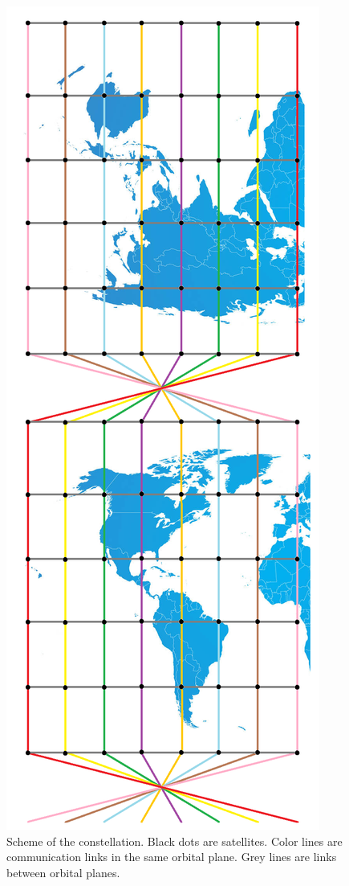\documentclass[12pt,a4paper]{article}
\begin{document}
\begin{figure}[H]
\centering
\includegraphics[scale=0.3]{network.png}
\caption[Shceme of the constellation]{Scheme of the constellation. Black dots are satellites. Color lines are communication links in the same orbital plane. Grey lines are links between orbital planes.}
\label{Scheme of the constellation}
\end{figure}
\end{document}
